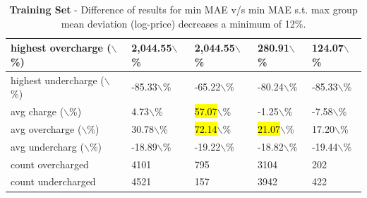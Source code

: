 \documentclass{article}
\begin{document}
\begin{table}[!ht]
\begin{tabular}{|l|l|l|l|l|}
        highest overcharge ($\backslash$\%) & 2,044.55$\backslash$\% & 2,044.55$\backslash$\% & 280.91$\backslash$\% & 124.07$\backslash$\% \\ \hline
        highest undercharge ($\backslash$\%) & -85.33$\backslash$\% & -65.22$\backslash$\% & -80.24$\backslash$\% & -85.33$\backslash$\% \\ \hline
        avg charge ($\backslash$\%) & 4.73$\backslash$\% & \hl{57.07}$\backslash$\% & -1.25$\backslash$\% & -7.58$\backslash$\% \\ \hline
        avg overcharge ($\backslash$\%) & 30.78$\backslash$\% & \hl{72.14}$\backslash$\% & \hl{21.07}$\backslash$\% & 17.20$\backslash$\% \\ \hline
        avg undercharg ($\backslash$\%) & -18.89$\backslash$\% & -19.22$\backslash$\% & -18.82$\backslash$\% & -19.44$\backslash$\% \\ \hline
        count overcharged & 4101 & 795 & 3104 & 202 \\ \hline
        count undercharged & 4521 & 157 & 3942 & 422 \\ \hline
    \end{tabular}
    \caption{\textbf{Training Set} - Difference of results for min MAE v/s min MAE s.t. max group mean deviation (log-price) decreases a minimum of 12\%.}
    \label{tab3:train_summary}
\end{table}
\end{document}
